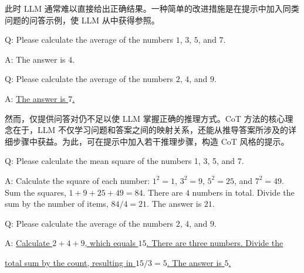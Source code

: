 此时 LLM 通常难以直接给出正确结果。一种简单的改进措施是在提示中加入同类问题的问答示例，使 LLM 从中获得参照。

\vspace{0.5em}
\begin{tcolorbox}[frame style={draw=none}]
\begingroup
\setlength{\leftskip}{2em}
\setlength{\rightskip}{2em}

Q: Please calculate the average of the numbers $1$, $3$, $5$, and $7$.

\vspace{0.3em}

A: The answer is $4$.

\vspace{0.7em}

Q: Please calculate the average of the numbers $2$, $4$, and $9$.

\vspace{0.3em}

A: \underline{The answer is $7$.}

\endgroup
\end{tcolorbox}
\vspace{0.5em}

然而，仅提供问答对仍不足以使 LLM 掌握正确的推理方式。CoT 方法的核心理念在于，LLM 不仅学习问题和答案之间的映射关系，还能从推导答案所涉及的详细步骤中获益。为此，可在提示中加入若干推理步骤，构造 CoT 风格的提示。

\vspace{0.5em}
\begin{tcolorbox}[frame style={draw=none}]
\begingroup
\setlength{\leftskip}{2em}
\setlength{\rightskip}{2em}

Q: Please calculate the mean square of the numbers 1, 3, 5, and 7.

\vspace{0.3em}

A: \textcolor[RGB]{154,245,175}{Calculate the square of each number: $1^2 = 1$, $3^2=9$, $5^2=25$, and $7^2=49$. Sum the squares, $1+9+25+49=84$. There are $4$ numbers in total. Divide the sum by the number of items, $84 / 4 = 21$.} The answer is $21$.

\vspace{0.7em}

Q: Please calculate the average of the numbers $2$, $4$, and $9$.

\vspace{0.3em}

A: \underline{\textcolor[RGB]{154,245,175}{Calculate $2 + 4 + 9$, which equals $15$. There are three numbers. Divide the}}

\underline{\textcolor[RGB]{154,245,175}{total sum by the count, resulting in $15/3=5$.} The answer is $5$.}

\endgroup
\end{tcolorbox}
\vspace{0.5em}


